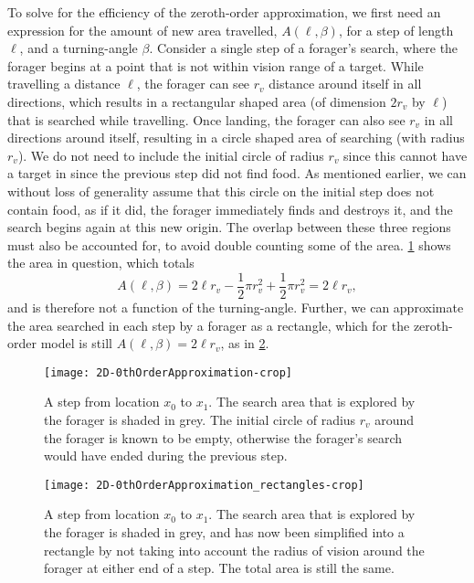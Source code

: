 To solve for the efficiency of the zeroth-order approximation, we first need an expression for the amount of new area travelled, $A(\ell,\beta)$, for a step of length $\ell$, and a turning-angle $\beta$. Consider a single step of a forager's search, where the forager begins at a point that is not within vision range of a target. While travelling a distance $\ell$, the forager can see $ r_v$ distance around itself in all directions, which results in a rectangular shaped area (of dimension $2 r_v$ by $\ell$) that is searched while travelling. Once landing, the forager can also see $r_v$ in all directions around itself, resulting in a circle shaped area of searching (with radius $r_v$). We do not need to include the initial circle of radius $r_v$ since this cannot have a target in since the previous step did not find food. As mentioned earlier, we can without loss of generality assume that this circle on the initial step does not contain food, as if it did, the forager immediately finds and destroys it, and the search begins again at this new origin. The overlap between these three regions must also be accounted for, to avoid double counting some of the area. \cref{fig:2dbless:searcharea} shows the area in question, which totals
\begin{equation*}
\label{eq:2dbless:searcharea}
A(\ell,\beta) = 2\ell r_v - \frac{1}{2}\pi r_v^2 + \frac{1}{2} \pi r_v^2 = 2\ell r_v,
\end{equation*}
and is therefore not a function of the turning-angle. Further, we can approximate the area searched in each step by a forager as a rectangle, which for the zeroth-order model is still $A(\ell,\beta) = 2\ell r_v$, as in \cref{fig:2dbless:searcharea_rectangle}.
\begin{figure}
	\centering[H]
	\texttt{[image: 2D-0thOrderApproximation-crop]}
	\caption[Area covered by a step in the zeroth-order model]{A step from location $x_0$ to $x_1$. The search area that is explored by the forager is shaded in grey. The initial circle of radius $r_v$ around the forager is known to be empty, otherwise the forager's search would have ended during the previous step. \label{fig:2dbless:searcharea}}
\end{figure}

\begin{figure}[h!]
	\centering
	\texttt{[image: 2D-0thOrderApproximation\_rectangles-crop]}
	\caption[Area covered by a step in the zeroth-order model, simplified into a rectangle]{A step from location $x_0$ to $x_1$. The search area that is explored by the forager is shaded in grey, and has now been simplified into a rectangle by not taking into account the radius of vision around the forager at either end of a step. The total area is still the same. \label{fig:2dbless:searcharea_rectangle}}
\end{figure}



